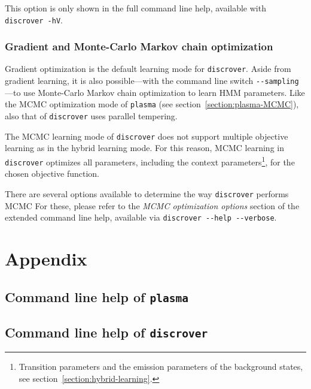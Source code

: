 \documentclass[a4paper]{article}
\newcommand{\plasma}[0]{\texttt{plasma}}
\newcommand{\discrover}[0]{\texttt{discrover}}
\begin{document}
This option is only shown in the full command line help, available with \verb|discrover -hV|.

\subsubsection{Gradient and Monte-Carlo Markov chain optimization}
Gradient optimization is the default learning mode for \discrover{}.
Aside from gradient learning, it is also possible---with the command line switch \verb|--sampling|---to use Monte-Carlo Markov chain optimization to learn HMM parameters.
Like the MCMC optimization mode of \plasma{} (see section~\ref{section:plasma-MCMC}), also that of \discrover{} uses parallel tempering.

The MCMC learning mode of \discrover{} does not support multiple objective learning as in the hybrid learning mode.
For this reason, MCMC learning in \discrover{} optimizes all parameters, including the context parameters\footnote{Transition parameters and the emission parameters of the background states, see section~\ref{section:hybrid-learning}.}, for the chosen objective function.

There are several options available to determine the way \discrover{} performs MCMC
For these, please refer to the \emph{MCMC optimization options} section of the extended command line help, available via \verb|discrover --help --verbose|.

\section{Appendix}
\subsection{Command line help of \plasma{}}
\label{appendix:plasma-cli-help}
{%
  \footnotesize
  
}

\subsection{Command line help of \discrover{}}
\label{appendix:discrover-cli-help}
{%
  \footnotesize
  
}



\nocite{*}
{}


\end{document}
